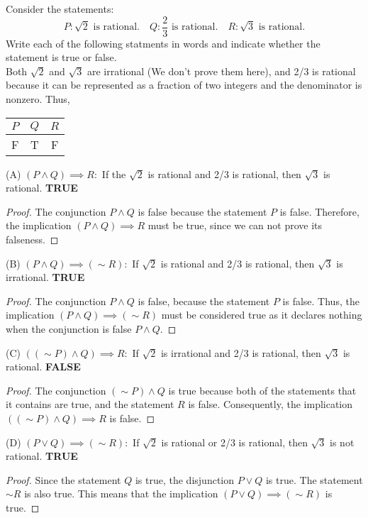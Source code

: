 \documentclass[12pt]{article}
\newenvironment{problem}[2][Problem]{\begin{trivlist}
		\item[\hskip \labelsep {\bfseries #1}\hskip \labelsep {\bfseries #2.}]}{\end{trivlist}}
\begin{document}
\begin{problem}{22}
	Consider the statements:
	\begin{equation}
		P:\sqrt{2} \text{ is rational.} \quad Q:\frac{2}{3} \text{ is rational.} \quad R:\sqrt{3} \text{ is rational.}
	\end{equation}
	Write each of the following statments in words and indicate whether the statement is true or false.\\
	
	Both $\sqrt{2}$ and $\sqrt{3}$ are irrational (We don't prove them here), and 2/3 is rational because it can be represented as a fraction of two integers and the denominator is nonzero. Thus,
	\begin{center}
		\begin{tabular}{c c c}
			$P$ & $Q$ & $R$ \\
			\hline
			F & T & F\\
			\hline
		\end{tabular}
	\end{center}
	(A) $(P \wedge Q) \implies R:$ If the $\sqrt{2}$ is rational and 2/3 is rational, then $\sqrt{3}$ is rational. \textbf{ TRUE}
	\begin{proof}
		The conjunction $P\wedge Q$ is false because the statement $P$ is false. Therefore, the implication $(P\wedge Q) \implies R$ must be true, since we can not prove its falseness.
	\end{proof}
	(B) $(P\wedge Q) \implies (\sim R):$ If $\sqrt{2}$ is rational and 2/3 is rational, then $\sqrt{3}$ is irrational. \textbf{ TRUE}
	\begin{proof}
		The conjunction $P \wedge Q$ is false, because the statement $P$ is false. Thus, the implication $(P\wedge Q) \implies (\sim R)$ must be considered true as it declares nothing when the conjunction is false $P \wedge Q$. 	
	\end{proof}
	(C) $((\sim P)\wedge Q) \implies R:$ If $\sqrt{2}$ is irrational and 2/3 is rational, then $\sqrt{3}$ is rational. \textbf{ FALSE}
	\begin{proof}
		The conjunction $(\sim P)\wedge Q$ is true because both of the statements that it contains are true, and the statement $R$ is false. Consequently, the implication $((\sim P)\wedge Q) \implies R$ is false.
	\end{proof}
	(D) $(P \vee Q) \implies (\sim R):$ If $\sqrt{2}$ is rational or 2/3 is rational, then $\sqrt{3}$ is not rational. \textbf{ TRUE}
	\begin{proof}
		Since the statement $Q$ is true, the disjunction $P \vee Q$ is true. The statement $\sim R$ is also true. This means that the implication $(P \vee Q) \implies (\sim R)$ is true.
	\end{proof}
\end{problem}
\end{document}
